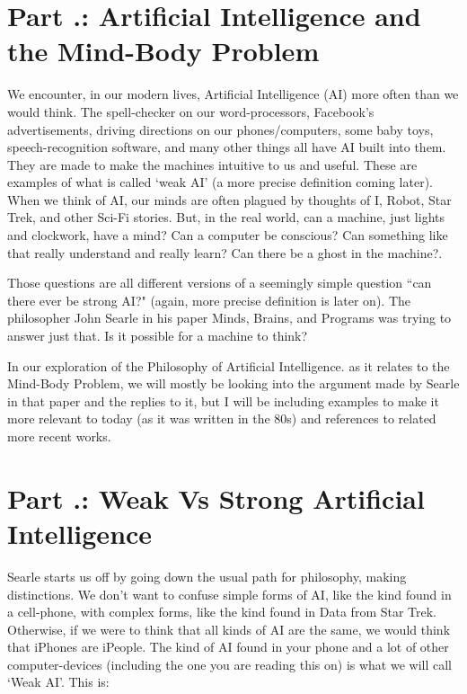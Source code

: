 \section{Part \thechapcount.\theseccount: Artificial Intelligence and the Mind-Body Problem}
We encounter, in our modern lives, Artificial Intelligence (AI) more often than we would think. The spell-checker on our word-processors, Facebook's advertisements, driving directions on our phones/computers, some baby toys, speech-recognition software, and many other things all have AI built into them. They are made to make the machines intuitive to us and useful. These are examples of what is called `weak AI' (a more precise definition coming later). When we think of AI, our minds are often plagued by thoughts of I, Robot, Star Trek, and other Sci-Fi stories. But, in the real world, can a machine, just lights and clockwork, have a mind? Can a computer be conscious? Can something like that really understand and really learn? Can there be a ghost in the machine?.

Those questions are all different versions of a seemingly simple question ``can there ever be strong AI?" (again, more precise definition is later on). The philosopher John Searle in his paper Minds, Brains, and Programs was trying to answer just that. Is it possible for a machine to think?

In our exploration of the Philosophy of Artificial Intelligence\autocite{SEPAI}. as it relates to the Mind-Body Problem, we will mostly be looking into the argument made by Searle in that paper and the replies to it, but I will be including examples to make it more relevant to today (as it was written in the 80s) and references to related more recent works.

\section{Part \thechapcount.\theseccount: Weak Vs Strong Artificial Intelligence}

Searle starts us off by going down the usual path for philosophy, making distinctions. We don't want to confuse simple forms of AI, like the kind found in a cell-phone, with complex forms, like the kind found in Data from Star Trek. Otherwise, if we were to think that all kinds of AI are the same, we would think that iPhones are iPeople. The kind of AI found in your phone and a lot of other computer-devices (including the one you are reading this on) is what we will call `Weak AI'. This is:

